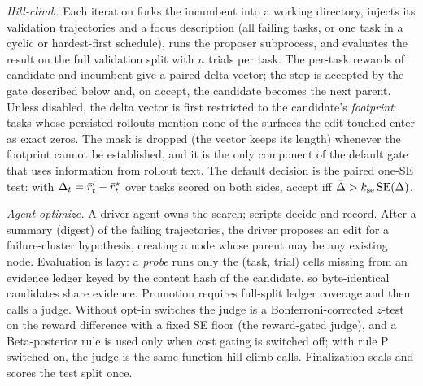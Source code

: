 \emph{Hill-climb.}
Each iteration forks the incumbent into a working directory, injects its validation trajectories and a focus
description (all failing tasks, or one task in a cyclic or hardest-first schedule), runs the proposer subprocess, and
evaluates the result on the full validation split with $n$ trials per task. The per-task rewards of candidate and
incumbent give a paired delta vector; the step is accepted by the gate described below and, on accept, the candidate
becomes the next parent.
Unless disabled, the delta vector is first restricted to the candidate's \emph{footprint}: tasks whose persisted
rollouts mention none of the surfaces the edit touched enter as exact zeros. The mask is dropped (the vector keeps its
length) whenever the footprint cannot be established, and it is the only component of the default gate that uses
information from rollout text.
The default decision is the paired one-SE test: with $\Delta_t=\bar r'_t-\bar r^\star_t$ over tasks scored on both sides,
accept iff $\bar\Delta > k_{\mathrm{se}}\,\mathrm{SE}(\Delta)$.

\emph{Agent-optimize.}
A driver agent owns the search; scripts decide and record. After a summary (digest) of the failing trajectories, the driver proposes an edit for a
failure-cluster hypothesis, creating a node whose parent may be any existing node. Evaluation is lazy: a \emph{probe}
runs only the (task, trial) cells missing from an evidence ledger keyed by the content hash of the candidate, so
byte-identical candidates share evidence. Promotion requires full-split ledger coverage and then calls a judge.
Without opt-in switches the judge is a Bonferroni-corrected $z$-test on the reward difference with a fixed SE floor
(the reward-gated judge), and a Beta-posterior rule is used only when cost gating is switched off; with rule P switched on, the judge is the same function hill-climb calls.
Finalization seals and scores the test split once.

